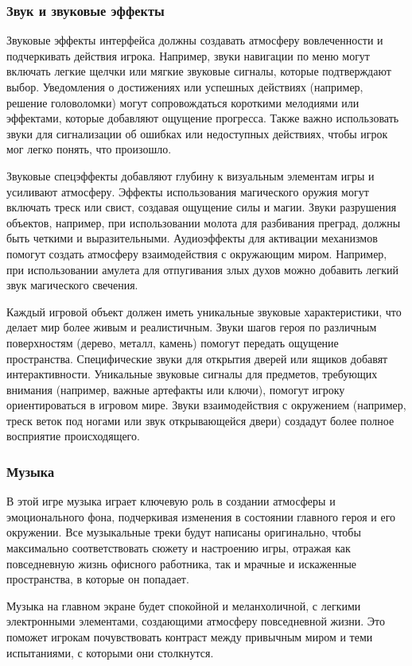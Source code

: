 \documentclass{article}
\begin{document}
	\subsubsection{Звук и звуковые эффекты}
    Звуковые эффекты интерфейса должны создавать атмосферу вовлеченности и подчеркивать действия игрока. Например, звуки навигации по меню могут включать легкие щелчки или мягкие звуковые сигналы, которые подтверждают выбор. Уведомления о достижениях или успешных действиях (например, решение головоломки) могут сопровождаться короткими мелодиями или эффектами, которые добавляют ощущение прогресса. Также важно использовать звуки для сигнализации об ошибках или недоступных действиях, чтобы игрок мог легко понять, что произошло.
    
    Звуковые спецэффекты добавляют глубину к визуальным элементам игры и усиливают атмосферу. Эффекты использования магического оружия могут включать треск или свист, создавая ощущение силы и магии. Звуки разрушения объектов, например, при использовании молота для разбивания преград, должны быть четкими и выразительными. Аудиоэффекты для активации механизмов помогут создать атмосферу взаимодействия с окружающим миром. Например, при использовании амулета для отпугивания злых духов можно добавить легкий звук магического свечения.
    
    Каждый игровой объект должен иметь уникальные звуковые характеристики, что делает мир более живым и реалистичным. Звуки шагов героя по различным поверхностям (дерево, металл, камень) помогут передать ощущение пространства. Специфические звуки для открытия дверей или ящиков добавят интерактивности. Уникальные звуковые сигналы для предметов, требующих внимания (например, важные артефакты или ключи), помогут игроку ориентироваться в игровом мире. Звуки взаимодействия с окружением (например, треск веток под ногами или звук открывающейся двери) создадут более полное восприятие происходящего.
	\subsubsection{Музыка}
    В этой игре музыка играет ключевую роль в создании атмосферы и эмоционального фона, подчеркивая изменения в состоянии главного героя и его окружении. Все музыкальные треки будут написаны оригинально, чтобы максимально соответствовать сюжету и настроению игры, отражая как повседневную жизнь офисного работника, так и мрачные и искаженные пространства, в которые он попадает.

    Музыка на главном экране будет спокойной и меланхоличной, с легкими электронными элементами, создающими атмосферу повседневной жизни. Это поможет игрокам почувствовать контраст между привычным миром и теми испытаниями, с которыми они столкнутся.
\end{document}
